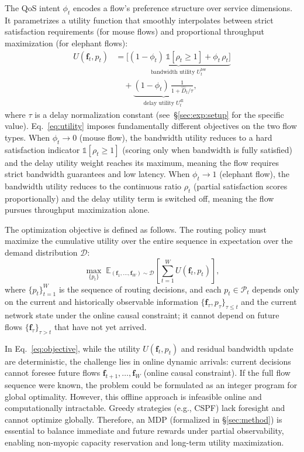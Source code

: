 The QoS intent $\phi_t$ encodes a flow's preference structure over service dimensions. It parametrizes a utility function that smoothly interpolates between strict satisfaction requirements (for mouse flows) and proportional throughput maximization (for elephant flows): 
\begin{equation}
\begin{split}
U(\mathbf{f}_t, p_t) &=
\underbrace{\big[(1-\phi_t)\,\mathbb{1}[\rho_t\!\ge\!1] + \phi_t\,\rho_t\big]}_{\text{bandwidth utility }U^{\text{bw}}_t} \\
&\quad +
\underbrace{(1-\phi_t)\,\frac{1}{1+\hat D_t/\tau}}_{\text{delay utility }U^{\text{dl}}_t},
\end{split}
\label{eq:utility}
\end{equation}
where $\tau$ is a delay normalization constant (see~\S\ref{sec:exp:setup} for the specific value).
Eq.~\eqref{eq:utility} imposes fundamentally different objectives on the two flow types. When $\phi_t\!\to\!0$ (mouse flow), the bandwidth utility reduces to a hard satisfaction indicator $\mathbb{1}[\rho_t\!\ge\!1]$ (scoring only when bandwidth is fully satisfied) and the delay utility weight reaches its maximum, meaning the flow requires strict bandwidth guarantees and low latency. When $\phi_t\!\to\!1$ (elephant flow), the bandwidth utility reduces to the continuous ratio $\rho_t$ (partial satisfaction scores proportionally) and the delay utility term is switched off, meaning the flow pursues throughput maximization alone.


The optimization objective is defined as follows. The routing policy must maximize the cumulative utility over the entire sequence in expectation over the demand distribution $\mathcal{D}$:
\begin{equation}
\max_{\{p_t\}}\;
\mathbb{E}_{(\mathbf{f}_1,\dots,\mathbf{f}_W)\sim\mathcal{D}}
\left[\sum_{t=1}^{W} U(\mathbf{f}_t, p_t)\right],
\label{eq:objective}
\end{equation}
where $\{p_t\}_{t=1}^{W}$ is the sequence of routing decisions, and each $p_t\in\mathcal{P}_t$ depends only on the current and historically observable information $\{\mathbf{f}_\tau, p_\tau\}_{\tau\le t}$ and the current network state under the online causal constraint; it cannot depend on future flows $\{\mathbf{f}_\tau\}_{\tau>t}$ that have not yet arrived.


In Eq.~\eqref{eq:objective}, while the utility $U(\mathbf{f}_t,p_t)$ and residual bandwidth update are deterministic, the challenge lies in online dynamic arrivals: current decisions cannot foresee future flows $\mathbf{f}_{t+1},\dots,\mathbf{f}_W$ (online causal constraint). If the full flow sequence were known, the problem could be formulated as an integer program for global optimality. However, this offline approach is infeasible online and computationally intractable. Greedy strategies (e.g., CSPF) lack foresight and cannot optimize globally. Therefore, an MDP (formalized in \S\ref{sec:method}) is essential to balance immediate and future rewards under partial observability, enabling non-myopic capacity reservation and long-term utility maximization.


